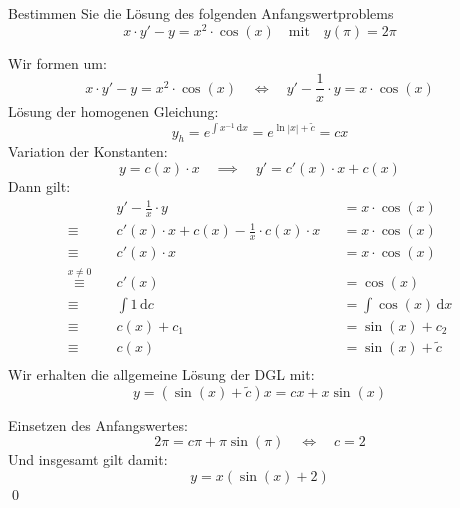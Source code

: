 \documentclass[answers]{exam}
\newcommand{\abs}[1]{\left| #1 \right|}
\renewcommand{\d}{\,\mathrm{d}}
\begin{document}
\begin{questions}
    \newpage
    \question
    Bestimmen Sie die Lösung des folgenden Anfangswertproblems
    $$
        x\cdot y' - y = x^2 \cdot \cos(x) \quad \text{mit} \quad y(\pi) = 2\pi
    $$
    \begin{solution}
        Wir formen um:
        $$
            x\cdot y' - y = x^2 \cdot \cos(x) \quad \iff \quad y' - \frac{1}{x}\cdot y = x \cdot \cos(x)
        $$
        Lösung der homogenen Gleichung:
        $$
            y_h = e^{\int x^{-1} \d x} = e^{\ln \abs{x} + \tilde{c}} = cx
        $$
        Variation der Konstanten:
        $$
            y = c(x) \cdot x \quad \implies \quad y' = c'(x) \cdot x + c(x)
        $$
        Dann gilt:
        $$
            \begin{aligned}
                                                 & y' - \frac{1}{x}\cdot y                              &  & = x \cdot \cos(x)    \\
                \equiv \quad                     & c'(x) \cdot x + c(x) - \frac{1}{x}\cdot c(x) \cdot x &  & = x \cdot \cos(x)    \\
                \equiv \quad                     & c'(x) \cdot x                                        &  & = x \cdot \cos(x)    \\
                \overset{x \neq 0}{\equiv} \quad & c'(x)                                                &  & =\cos(x)             \\
                \equiv \quad                     & \int 1 \d c                                          &  & =\int \cos(x) \d x   \\
                \equiv \quad                     & c(x) + c_1                                           &  & =\sin(x) + c_2       \\
                \equiv \quad                     & c(x)                                                 &  & =\sin(x) + \tilde{c} \\
            \end{aligned}
        $$
        Wir erhalten die allgemeine Lösung der DGL mit:
        $$
            y = (\sin(x) + \tilde{c}) x = cx + x\sin(x)
        $$

        Einsetzen des Anfangswertes:
        $$
            2\pi = c\pi + \pi\sin(\pi) \quad \iff \quad c = 2
        $$
        Und insgesamt gilt damit:
        $$
            y = x(\sin(x) + 2)
        $$\qed
    \end{solution}
\end{questions}
\end{document}
